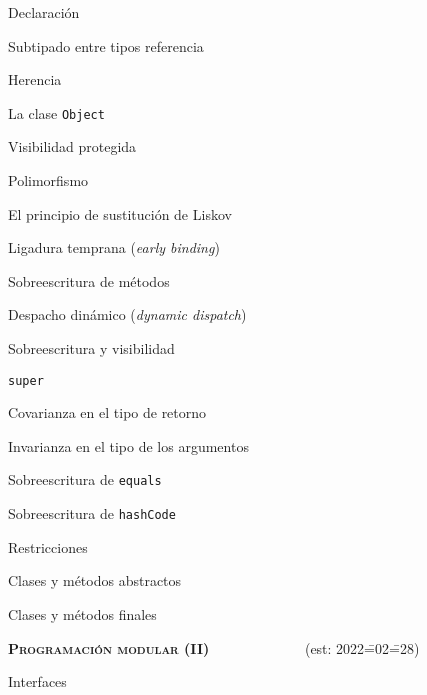 \begin{longenum}
\begin{longenum}
\begin{longenum}
            \item Declaración
            \item Subtipado entre tipos referencia
            \item Herencia
            \item La clase \texttt{Object}
            \item Visibilidad protegida
        \end{longenum}
        \item Polimorfismo
        \begin{longenum}
            \item El principio de sustitución de Liskov
            \begin{longenum}
                \item Ligadura temprana (\textit{early binding})
            \end{longenum}
            \item Sobreescritura de métodos
            \begin{longenum}
                \item Despacho dinámico (\textit{dynamic dispatch})
                \item Sobreescritura y visibilidad
                \item \texttt{super}
                \item Covarianza en el tipo de retorno
                \item Invarianza en el tipo de los argumentos
                \item Sobreescritura de \texttt{equals}
                \item Sobreescritura de \texttt{hashCode}
            \end{longenum}
        \end{longenum}
        \item Restricciones
        \begin{longenum}
            \item Clases y métodos abstractos
            \item Clases y métodos finales
        \end{longenum}
    \end{longenum}
    \item \textbf{\textsc{Programación modular (II)}} \ \ \ \ \ \ \ \ \ \ \ \ \ (est: 2022\==02\==28)
    \begin{longenum}
        \item Interfaces

\end{longenum}
\end{longenum}
